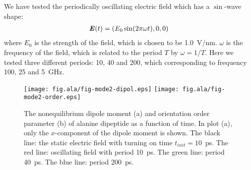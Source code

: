 \documentclass[a4paper,preprint,unsortedaddress,onecolumn]{revtex4-1}
\newcommand{\vect}[1]{\textbf{\textit{#1}}}
\begin{document}
We have tested the periodically oscillating electric field which has
a $\sin$-wave shape:
\begin{align}
  \vect E(t) = (E_0\sin(2\pi \omega t), 0, 0)
\end{align}
where $E_0$ is the strength of the field, which is chosen to be
1.0~V/nm.  $\omega$ is the frequency of the field, which is related to
the period $T$ by $\omega = 1/T$.  Here we tested three different
periods: 10, 40 and 200, which corresponding
to frequency 100, 25 and 5~GHz.


\begin{figure}
  \centering
  \texttt{[image: fig.ala/fig-mode2-dipol.eps]}
  \texttt{[image: fig.ala/fig-mode2-order.eps]}
  \caption{The nonequilibrium dipole moment (a) and
    orientation order parameter (b) of alanine dipeptide as a
    function of time. In plot (a),
    only the $x$-component of the dipole moment is
    shown. The black line: the static electric field with turning on
    time $t_{init} = 10$~ps. The red line: oscillating field with period
    10~ps. The green line: period 40~ps. The blue line: period 200~ps.}
  \label{fig:tmp8}
\end{figure}
\end{document}
